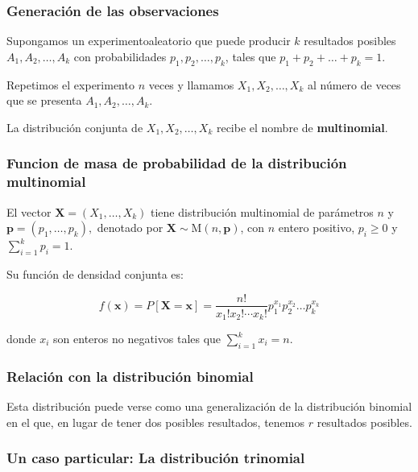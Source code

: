 \documentclass[
]{article}
\begin{document}
\subsubsection{Generación de las observaciones}\label{generaciuxf3n-de-las-observaciones}

Supongamos un experimentoaleatorio que puede producir \(k\) resultados posibles \(A_1, A_2, \dots, A_k\) con probabilidades \(p_1, p_2, \dots, p_k\), tales que \(p_1 + p_2 + \dots + p_k = 1\).

Repetimos el experimento \(n\) veces y llamamos \(X_1, X_2, \dots, X_k\) al número de veces que se presenta \(A_1, A_2, \dots, A_k\).

La distribución conjunta de \(X_1, X_2, \dots, X_k\) recibe el nombre de \textbf{multinomial}.

\subsubsection{Funcion de masa de probabilidad de la distribución multinomial}\label{funcion-de-masa-de-probabilidad-de-la-distribuciuxf3n-multinomial}

El vector \(\mathbf{X} = (X_1, \dots, X_k)\) tiene distribución multinomial de parámetros \(n\) y \(\mathbf{p} = (p_1, \dots, p_k),\) denotado por \(\mathbf{X} \sim \mathrm{M}(n, \mathbf{p})\), con \(n\) entero positivo, \(p_i \geq 0\) y \(\sum_{i=1}^{k} p_i = 1\).

Su función de densidad conjunta es:

\[
f(\mathbf{x}) = P[\mathbf{X} = \mathbf{x}] = \frac{n!}{x_1!x_2!\cdots x_k!} p_1^{x_1} p_2^{x_2} \dots p_k^{x_k}
\]

donde \(x_i\) son enteros no negativos tales que \(\sum_{i=1}^{k} x_i = n\).

\subsubsection{Relación con la distribución binomial}\label{relaciuxf3n-con-la-distribuciuxf3n-binomial}

Esta distribución puede verse como una generalización de la distribución binomial en el que, en lugar de tener dos posibles resultados, tenemos \(r\) resultados posibles.

\subsubsection{Un caso particular: La distribución trinomial}\label{un-caso-particular-la-distribuciuxf3n-trinomial}
\end{document}
